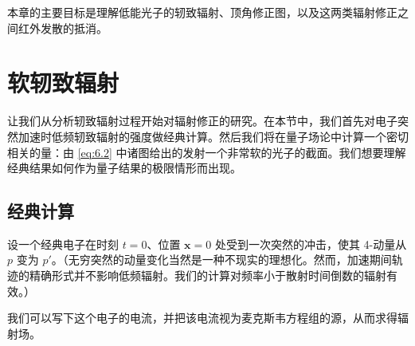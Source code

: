 本章的主要目标是理解低能光子的轫致辐射、顶角修正图，以及这两类辐射修正之间红外发散的抵消。

\section{软轫致辐射}

让我们从分析轫致辐射过程开始对辐射修正的研究。在本节中，我们首先对电子突然加速时低频轫致辐射的强度做经典计算。然后我们将在量子场论中计算一个密切相关的量：由 \eqref{eq:6.2} 中诸图给出的发射一个非常软的光子的截面。我们想要理解经典结果如何作为量子结果的极限情形而出现。

\subsection{经典计算}

设一个经典电子在时刻 $t=0$、位置 $\mathbf{x}=0$ 处受到一次突然的冲击，使其 4-动量从 $p$ 变为 $p'$。（无穷突然的动量变化当然是一种不现实的理想化。然而，加速期间轨迹的精确形式并不影响低频辐射。我们的计算对频率小于散射时间倒数的辐射有效。）

我们可以写下这个电子的电流，并把该电流视为麦克斯韦方程组的源，从而求得辐射场。

